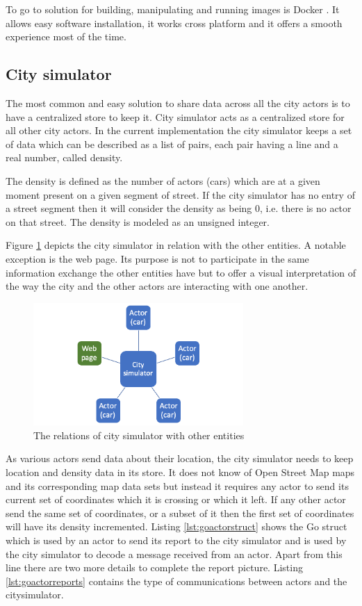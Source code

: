 \documentclass[conference]{IEEEtran}
\begin{document}
To go to solution for building, manipulating and running images is Docker \citep{docker}. It allows easy software installation, it works cross platform and it offers a smooth experience most of the time.

\subsection{City simulator}
\label{subsection:citysimulator}

The most common and easy solution to share data across all the city actors is to have a centralized store to keep it. City simulator acts as a centralized store for all other city actors. In the current implementation the city simulator keeps a set of data which can be described as a list of pairs, each pair having a line and a real number, called density.

The density is defined as the number of actors (cars) which are at a given moment present on a given segment of street. If the city simulator has no entry of a street segment then it will consider the density as being 0, i.e. there is no actor on that street. The density is modeled as an unsigned integer.

Figure \ref{fig:citysimrelations} depicts the city simulator in relation with the other entities. A notable exception is the web page. Its purpose is not to participate in the same information exchange the other entities have but to offer a visual interpretation of the way the city and the other actors are interacting with one another.

\begin{figure}
    \includegraphics[width=8cm]{CitySimulator.png}
    \centering
    \caption{The relations of city simulator with other entities}
    \label{fig:citysimrelations}
\end{figure}

As various actors send data about their location, the city simulator needs to keep location and density data in its store. It does not know of Open Street Map maps and its corresponding map data sets but instead it requires any actor to send its current set of coordinates which it is crossing or which it left. If any other actor send the same set of coordinates, or a subset of it then the first set of coordinates will have its density incremented. Listing \ref{lst:goactorstruct} shows the Go struct which is used by an actor to send its report to the city simulator and is used by the city simulator to decode a message received from an actor. Apart from this line there are two more details to complete the report picture. Listing \ref{lst:goactorreports} contains the type of communications between actors and the citysimulator.
\end{document}
